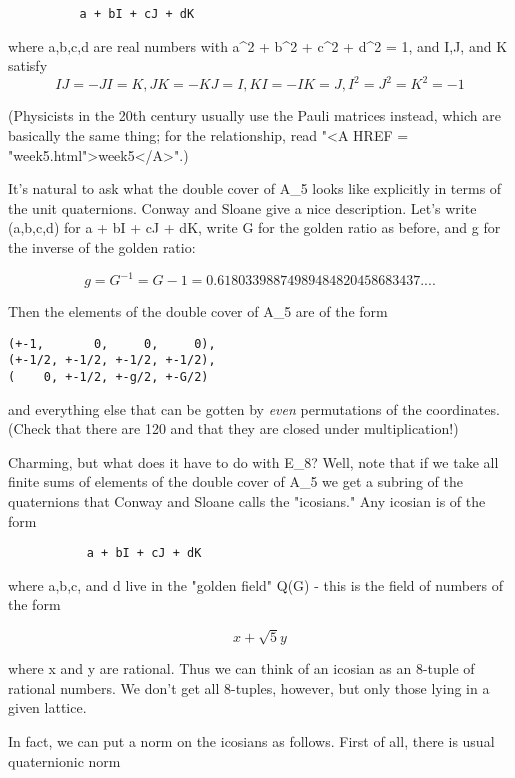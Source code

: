 \begin{verbatim}
          a + bI + cJ + dK
\end{verbatim}
    
where a,b,c,d are real numbers with a^{2} + b^{2} + c^{2} + d^{2} = 1, and
I,J, and K satisfy 
$$
IJ = -JI = K,	JK = -KJ = I,    KI = -IK = J,   I^{2} = J^{2} = K^{2} = -1
$$
    
(Physicists in the 20th century usually use the Pauli matrices instead,
which are basically the same thing; for the relationship, read "<A HREF = "week5.html">week5</A>".)


It's natural to ask what the double cover of A_{5} looks like
explicitly in terms of the unit quaternions.  Conway and Sloane give a
nice description.  Let's write (a,b,c,d) for a + bI + cJ + dK, write G
for the golden ratio as before, and g for the inverse of the golden
ratio:

$$
 g = G^{-1} = G - 1 = 0.61803398874989484820458683437....
$$
    
Then the elements of the double cover of A_{5} are of the form
\begin{verbatim}
(+-1,       0,     0,     0),
(+-1/2, +-1/2, +-1/2, +-1/2),
(    0, +-1/2, +-g/2, +-G/2)
\end{verbatim}
    
and everything else that can be gotten by \emph{even} permutations of the
coordinates.  (Check that there are 120 and that they are closed under
multiplication!)  


Charming, but what does it have to do with E_{8}?  Well, note
that if we take all finite sums of elements of the double cover of 
A_{5} we get a subring of the quaternions that Conway and Sloane 
calls the "icosians."  Any icosian is of the form

\begin{verbatim}
           a + bI + cJ + dK
\end{verbatim}
    

where a,b,c, and d live in the "golden field" Q(G) - this is the field
of numbers of the form

$$
            x + \sqrt 5 y
$$
    

where x and y are rational.  Thus we can think of an icosian as an
8-tuple of rational numbers.  We don't get all 8-tuples, however, but
only those lying in a given lattice.  

In fact, we can put a norm on the icosians as follows.  First of all, 
there is usual quaternionic norm

